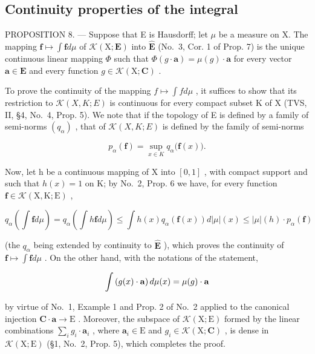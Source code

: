 \subsection{Continuity properties of the integral}

PROPOSITION 8. --- Suppose that E is Hausdorff; let \(\mu\) be a measure on X. The mapping \(\mathbf{f} \mapsto \int \mathbf{f} d\mu\) of \(\mathcal{K}(\mathrm{X};\mathbf{E})\) into \(\widehat{\mathbf{E}}\) (No.~3, Cor. 1 of Prop. 7) is the unique continuous linear mapping \(\Phi\) such that \(\Phi(g \cdot \mathbf{a}) = \mu(g) \cdot \mathbf{a}\) for every vector \(\mathbf{a} \in \mathbf{E}\) and every function \(g \in \mathcal{K}(\mathrm{X};\mathbf{C})\) .

To prove the continuity of the mapping \(f \mapsto \int f d\mu\) , it suffices to show that its restriction to \(\mathcal{K}(X, K; E)\) is continuous for every compact subset K of X (TVS, II, §4, No.~4, Prop. 5). We note that if the topology of E is defined by a family of semi-norms \((q_{\alpha})\) , that of \(\mathcal{K}(X, K; E)\) is defined by the family of semi-norms

\[
p _ {\alpha} (\mathbf {f}) = \sup _ {x \in K} q _ {\alpha} \bigl (\mathbf {f} (x) \bigr).
\]

Now, let h be a continuous mapping of X into \([0,1]\) , with compact support and such that \(h(x)=1\) on K; by No.~2, Prop. 6 we have, for every function \(\mathbf{f}\in\mathcal{K}(\mathrm{X},\mathrm{K};\mathrm{E})\) ,

\[
q _ {\alpha} \left(\int \mathbf {f} d \mu\right) = q _ {\alpha} \left(\int h \mathbf {f} d \mu\right) \leqslant \int h (x) q _ {\alpha} (\mathbf {f} (x)) d | \mu | (x) \leqslant | \mu | (h) \cdot p _ {\alpha} (\mathbf {f})
\]

(the \(q_{\alpha}\) being extended by continuity to \(\widehat{\mathbf{E}}\) ), which proves the continuity of \(\mathbf{f} \mapsto \int \mathbf{f} d\mu\) . On the other hand, with the notations of the statement,

\[
\int \left(g (x) \cdot {\bf a}\right) d \mu (x) = \mu (g) \cdot {\bf a}
\]

by virtue of No.~1, Example 1 and Prop. 2 of No.~2 applied to the canonical injection \(\mathbf{C} \cdot \mathbf{a} \to \mathrm{E}\) . Moreover, the subspace of \(\mathcal{K}(\mathrm{X};\mathrm{E})\) formed by the linear combinations \(\sum_{i} g_i \cdot \mathbf{a}_i\) , where \(\mathbf{a}_i \in \mathrm{E}\) and \(g_i \in \mathcal{K}(\mathrm{X};\mathbf{C})\) , is dense in \(\mathcal{K}(\mathrm{X};\mathrm{E})\) (§1, No.~2, Prop. 5), which completes the proof.

